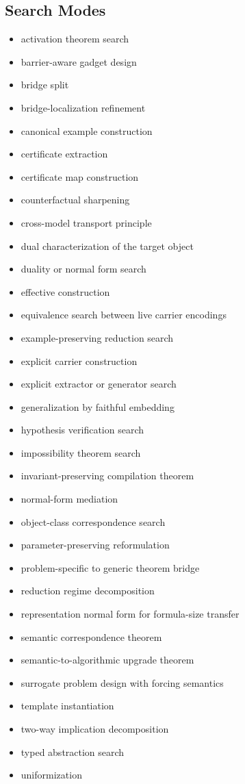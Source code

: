 \documentclass[11pt]{article}
\begin{document}
\subsection*{Search Modes}
\begin{itemize}[leftmargin=*,itemsep=0.2em]
\item activation theorem search
\item barrier-aware gadget design
\item bridge split
\item bridge-localization refinement
\item canonical example construction
\item certificate extraction
\item certificate map construction
\item counterfactual sharpening
\item cross-model transport principle
\item dual characterization of the target object
\item duality or normal form search
\item effective construction
\item equivalence search between live carrier encodings
\item example-preserving reduction search
\item explicit carrier construction
\item explicit extractor or generator search
\item generalization by faithful embedding
\item hypothesis verification search
\item impossibility theorem search
\item invariant-preserving compilation theorem
\item normal-form mediation
\item object-class correspondence search
\item parameter-preserving reformulation
\item problem-specific to generic theorem bridge
\item reduction regime decomposition
\item representation normal form for formula-size transfer
\item semantic correspondence theorem
\item semantic-to-algorithmic upgrade theorem
\item surrogate problem design with forcing semantics
\item template instantiation
\item two-way implication decomposition
\item typed abstraction search
\item uniformization
\end{itemize}
\end{document}
